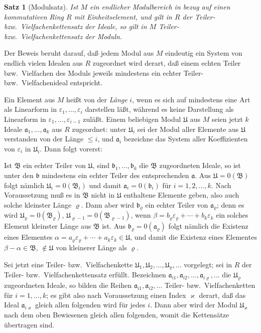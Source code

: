 \documentclass[12pt,a4paper]{article}
\newcommand{\fB}{\mathfrak{B}}
\newcommand{\fU}{\mathfrak{U}}
\theoremstyle{plain}
\newtheorem{Satz}{Satz}[section]
\theoremstyle{definition}
\theoremstyle{remark}
\begin{document}
\begin{Satz}[Modulsatz]
Ist $M$ ein endlicher Modulbereich in bezug auf einen kommutativen Ring $R$ mit Einheitselement, und gilt in $R$ der Teiler- bzw.\ Vielfachenkettensatz der Ideale, so gilt in $M$ Teiler- bzw.\ Vielfachenkettensatz der Moduln.
\end{Satz}

Der Beweis beruht darauf, daß jedem Modul aus $M$ eindeutig ein System von endlich vielen Idealen aus $R$ zugeordnet wird derart, daß einem echten Teiler bzw.\ Vielfachen des Moduls jeweils mindestens ein echter Teiler- bzw.\ Vielfachenideal entspricht.

Ein Element aus $M$ heißt von der \textit{Länge} $i$, wenn es sich auf mindestens eine Art als Linearform in $\varepsilon_{1},\dots,\varepsilon_{i}$ darstellen läßt, während es keine Darstellung als Linearform in $\varepsilon_{1},\dots,\varepsilon_{i-1}$ zuläßt. Einem beliebigen Modul $\fU$ aus $M$ seien jetzt $k$ Ideale $\mathfrak{a}_{1},\dots,\mathfrak{a}_{k}$ aus $R$ zugeordnet: unter $\fU_{i}$ sei der Modul aller Elemente aus $\fU$ verstanden von der Länge $\leq i$, und $\mathfrak{a}_{i}$ bezeichne das System aller Koeffizienten von $\varepsilon_{i}$ in $\fU_{i}$. Dann folgt vorerst:

Ist $\fB$ ein echter Teiler von $\fU$, sind $\mathfrak{b}_{1},\dots,\mathfrak{b}_{k}$ die $\fB$ zugeordneten Ideale, so ist unter den $\mathfrak{b}$ mindestens ein echter Teiler des entsprechenden $\mathfrak{a}$. Aus $\fU = 0(\fB)$ folgt nämlich $\fU_{i} = 0(\fB_{i})$ und damit $\mathfrak{a}_{i} = 0(\mathfrak{b}_{i})$ für $i = 1, 2,\dots,k$. Nach Voraussetzung muß es in $\fB$ nicht in $\fU$ enthaltene Elemente geben, also auch solche kleinster Länge $\varrho$. Dann aber wird $\mathfrak{b}_{\varrho}$ ein echter Teiler von $\mathfrak{a}_{\varrho}$; denn es wird $\fU_{\varrho} = 0(\fB_{\varrho})$, $\fU_{\varrho-1} = 0(\fB_{\varrho-1})$, wenn $\beta = b_{\varrho}\varepsilon_{\varrho} + \cdots + b_{k}\varepsilon_{k}$ ein solches Element kleinster Länge aus $\fB$ ist. Aus $\mathfrak{b}_{\varrho} = 0(\mathfrak{a}_{\varrho})$ folgt nämlich die Existenz eines Elementes $\alpha = a_{\varrho}\varepsilon_{\varrho} + \cdots + a_{k}\varepsilon_{k} \in \fU$, und damit die Existenz eines Elementes $\beta - \alpha \in \fB$, $\notin \fU$ von kleinerer Länge als $\varrho$.

Sei jetzt eine Teiler- bzw.\ Vielfachenkette $\fU_{1}, \fU_{2},\dots, \fU_{\varrho},\dots$ vorgelegt; sei in $R$ der Teiler- bzw.\ Vielfachenkettensatz erfüllt. Bezeichnen $\mathfrak{a}_{i1}, \mathfrak{a}_{i2},\dots, \mathfrak{a}_{i\varrho},\dots$ die $\fU_{\varrho}$ zugeordneten Ideale, so bilden die Reihen $\mathfrak{a}_{i1}, \mathfrak{a}_{i2},\dots$ Teiler- bzw.\ Vielfachenketten für $i = 1,\dots,k$; es gibt also nach Voraussetzung einen Index $\varkappa$ derart, daß das Ideal $\mathfrak{a}_{i\varkappa}$ gleich allen folgenden wird für jedes $i$. Dann aber wird der Modul $\fU_{\varkappa}$ nach dem oben Bewiesenen gleich allen folgenden, womit die Kettensätze übertragen sind.
\end{document}

